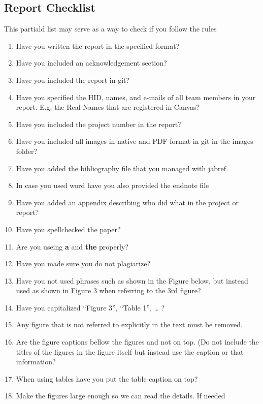 \subsection{Report Checklist}\label{report-checklist}

This partiald list may serve as a way to check if you follow the rules

\begin{enumerate}
\tightlist
\item
  Have you written the report in the specified format?
\item
  Have you included an acknowledgement section?
\item
  Have you included the report in git?
\item
  Have you specified the HID, names, and e-mails of all team members in
  your report. E.g. the Real Names that are registered in Canvas?
\item
  Have you included the project number in the report?
\item
  Have you included all images in native and PDF format in git in the
  images folder?
\item
  Have you added the bibliography file that you managed with jabref
\item
  In case you used word have you also provided the endnote file
\item
  Have you added an appendix describing who did what in the project or
  report?
\item
  Have you spellchecked the paper?
\item
  Are you useing \textbf{a} and \textbf{the} properly?
\item
  Have you made sure you do not plagiarize?
\item
  Have you not used phrases such as shown in the Figure below, but
  instead used as shown in Figure 3 when referring to the 3rd figure?
\item
  Have you capitalized ``Figure 3'', ``Table 1'', \ldots{} ?
\item
  Any figure that is not referred to explicitly in the text must be
  removed.
\item
  Are the figure captions bellow the figures and not on top. (Do not
  include the titles of the figures in the figure itself but instead use
  the caption or that information?
\item
  When using tables have you put the table caption on top?
\item
  Make the figures large enough so we can read the details. If needed

\end{enumerate}

